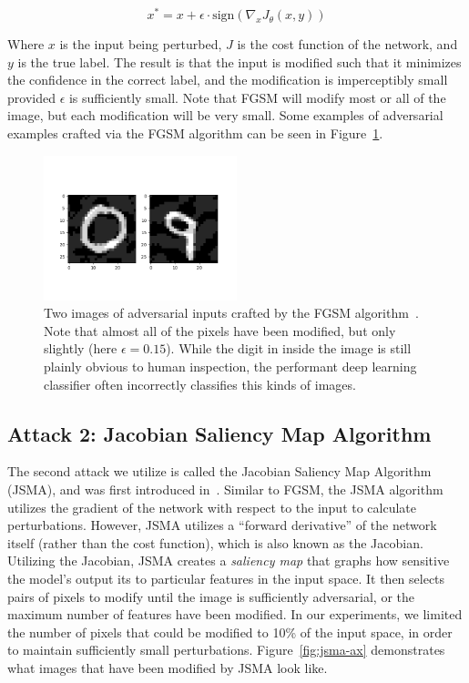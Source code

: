 \documentclass{article}
\begin{document}
\begin{equation}
  x^* = x + \epsilon \cdot {\text{sign}}(\nabla_xJ_\theta(x, y))
\end{equation}

\noindent
Where $x$ is the input being perturbed, $J$ is the cost function of the network,
and $y$ is the true label. The result is that the input is modified such that it
minimizes the confidence in the correct label, and the modification is
imperceptibly small provided $\epsilon$ is sufficiently small. Note that FGSM
will modify most or all of the image, but each modification will be very small.
Some examples of adversarial examples crafted via the FGSM algorithm can be seen
in Figure~\ref{fig:fgsm-ax}.

\begin{figure}
  \includegraphics[width=0.5\textwidth]{fgsm}
  \caption{Two images of adversarial inputs crafted by the FGSM
    algorithm~\cite{goodfellow2014explaining}. Note
  that almost all of the pixels have been modified, but only slightly (here
$\epsilon = 0.15$). While the digit in inside the image is still plainly obvious
to human inspection, the performant deep learning classifier often incorrectly
classifies this kinds of images.}%
  \label{fig:fgsm-ax}
\end{figure}

\subsection{Attack 2: Jacobian Saliency Map Algorithm}

The second attack we utilize is called the Jacobian Saliency Map Algorithm
(JSMA), and was first introduced in~\cite{papernot2016limitations}. Similar to
FGSM, the JSMA algorithm utilizes the gradient of the network with respect to
the input to calculate perturbations. However, JSMA utilizes a ``forward
derivative'' of the network itself (rather than the cost function), which is
also known as the Jacobian. Utilizing the Jacobian, JSMA creates a
\textit{saliency map} that graphs how sensitive the model's output its to
particular features in the input space. It then selects pairs of pixels to
modify until the image is sufficiently adversarial, or the maximum number of
features have been modified. In our experiments, we limited the number of pixels
that could be modified to 10\% of the input space, in order to maintain
sufficiently small perturbations. Figure~\ref{fig:jsma-ax} demonstrates what
images that have been modified by JSMA look like.
\end{document}
